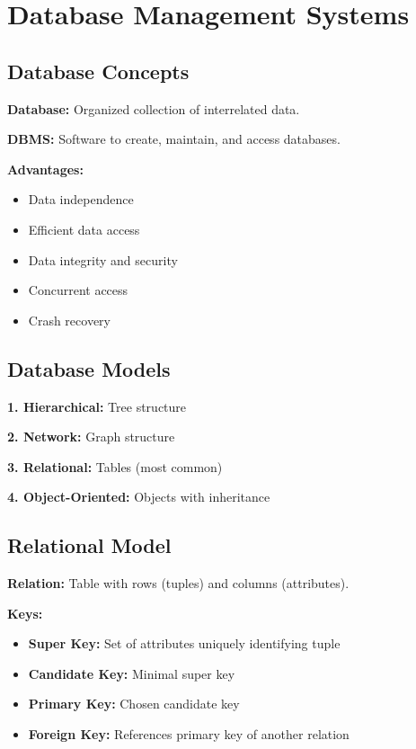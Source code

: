 \documentclass[11pt,a4paper]{article}
\begin{document}
\section{Database Management Systems}

\subsection{Database Concepts}

\begin{defbox}
\textbf{Database:} Organized collection of interrelated data.
\end{defbox}

\begin{defbox}
\textbf{DBMS:} Software to create, maintain, and access databases.
\end{defbox}

\textbf{Advantages:}
\begin{itemize}
    \item Data independence
    \item Efficient data access
    \item Data integrity and security
    \item Concurrent access
    \item Crash recovery
\end{itemize}

\subsection{Database Models}

\textbf{1. Hierarchical:} Tree structure

\textbf{2. Network:} Graph structure

\textbf{3. Relational:} Tables (most common)

\textbf{4. Object-Oriented:} Objects with inheritance

\subsection{Relational Model}

\begin{defbox}
\textbf{Relation:} Table with rows (tuples) and columns (attributes).
\end{defbox}

\textbf{Keys:}
\begin{itemize}
    \item \textbf{Super Key:} Set of attributes uniquely identifying tuple
    \item \textbf{Candidate Key:} Minimal super key
    \item \textbf{Primary Key:} Chosen candidate key
    \item \textbf{Foreign Key:} References primary key of another relation
\end{itemize}
\end{document}
